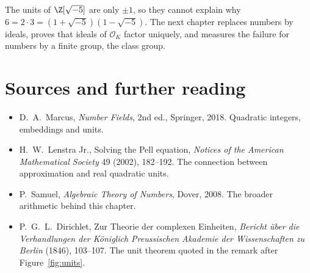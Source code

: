 The units of $\Z[\sqrt{-5}]$ are only $\pm1$, so they cannot explain why $6=2\cdot3=(1+\sqrt{-5})(1-\sqrt{-5})$. The next chapter replaces numbers by ideals, proves that ideals of $\mathcal O_K$ factor uniquely, and measures the failure for numbers by a finite group, the class group.

\section*{Sources and further reading}
\begin{itemize}
\item D.~A.~Marcus, \emph{Number Fields}, 2nd ed., Springer, 2018.
Quadratic integers, embeddings and units.
\item H.~W.~Lenstra Jr., Solving the Pell equation,
\emph{Notices of the American Mathematical Society} 49 (2002), 182--192.
The connection between approximation and real quadratic units.
\item P.~Samuel, \emph{Algebraic Theory of Numbers}, Dover, 2008.
The broader arithmetic behind this chapter.
\item P.~G.~L.~Dirichlet, Zur Theorie der complexen Einheiten,
\emph{Bericht \"uber die Verhandlungen der K\"oniglich Preussischen Akademie der Wissenschaften zu Berlin} (1846), 103--107.
The unit theorem quoted in the remark after Figure~\ref{fig:units}.
\end{itemize}
